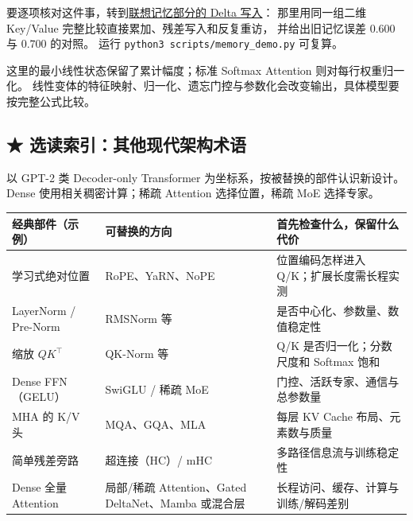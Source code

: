要逐项核对这件事，转到\hyperref[concept:delta-rule]{联想记忆部分的 Delta 写入}：
那里用同一组二维 Key/Value 完整比较直接累加、残差写入和反复重访，
并给出旧记忆误差 $0.600$ 与 $0.700$ 的对照。
运行 \texttt{python3 scripts/memory\_demo.py} 可复算。

\begin{boundarybox}
这里的最小线性状态保留了累计幅度；标准 Softmax Attention 则对每行权重归一化。
线性变体的特征映射、归一化、遗忘门控与参数化会改变输出，具体模型要按完整公式比较。
\end{boundarybox}

\subsection{\texorpdfstring{{\symboliconfont ★}}{★} 选读索引：其他现代架构术语}
\label{sec:modern-term-index}

以 GPT-2 类 Decoder-only Transformer 为坐标系，按被替换的部件认识新设计。
Dense 使用相关稠密计算；稀疏 Attention 选择位置，稀疏 MoE 选择专家。

\begin{center}
\small
\renewcommand{\arraystretch}{1.25}
\begin{tabularx}{\linewidth}{@{}>{\raggedright\arraybackslash}p{29mm}>{\raggedright\arraybackslash}p{41mm}>{\raggedright\arraybackslash}X@{}}
\toprule
经典部件（示例） & 可替换的方向 & 首先检查什么，保留什么代价\\\midrule
学习式绝对位置 & RoPE、YaRN、NoPE & 位置编码怎样进入 Q/K；扩展长度需长程实测\\
LayerNorm / Pre-Norm & RMSNorm 等 & 是否中心化、参数量、数值稳定性\\
缩放 $QK^\top$ & QK-Norm 等 & Q/K 是否归一化；分数尺度和 Softmax 饱和\\
Dense FFN（GELU） & SwiGLU / 稀疏 MoE & 门控、活跃专家、通信与总参数量\\
MHA 的 K/V 头 & MQA、GQA、MLA & 每层 KV Cache 布局、元素数与质量\\
简单残差旁路 & 超连接（HC）/ mHC & 多路径信息流与训练稳定性\\
Dense 全量 Attention & 局部/稀疏 Attention、Gated DeltaNet、Mamba 或混合层 & 长程访问、缓存、计算与训练/解码差别\\
\bottomrule
\end{tabularx}
\end{center}

